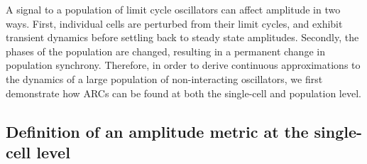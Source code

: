 \documentclass[11pt, letterpaper]{article}
\providecommand{\DIFadd}[1]{{\protect\color{blue}#1}} %
\providecommand{\DIFdel}[1]{{\protect\color{red}}}                      %
\providecommand{\DIFaddbegin}{} %
\providecommand{\DIFaddend}{} %
\providecommand{\DIFdelbegin}{} %
\providecommand{\DIFdelend}{} %
\begin{document}
\DIFadd{A signal to a population of limit cycle oscillators can affect amplitude in two ways.
First, individual cells are perturbed from their limit cycles, and exhibit transient dynamics before settling back to steady state amplitudes.
Secondly, the phases of the population are changed, resulting in a permanent change in population synchrony.
Therefore, in order to derive continuous approximations to the dynamics of a large population of non-interacting oscillators, we first demonstrate how ARCs can be found at both the single-cell and population level.
}

\DIFaddend \subsection*{Definition of an amplitude metric \DIFaddbegin \DIFadd{at the single-cell level}\DIFaddend }
\DIFdelbegin \DIFdel{The path which }\DIFdelend \DIFaddbegin 
\end{document}
